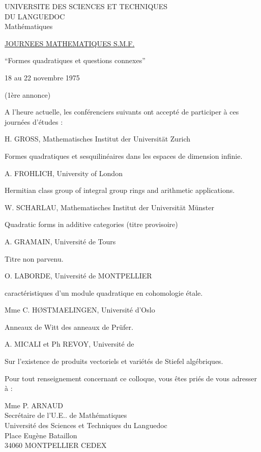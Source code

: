 UNIVERSITE DES SCIENCES ET TECHNIQUES\\
DU LANGUEDOC\\
Mathématiques

\uline{JOURNEES MATHEMATIQUES S.M.F.}

``Formes quadratiques et questions connexes''

18 au 22 novembre 1975

(1ère annonce)

A l'heure actuelle, les conférenciers suivants ont accepté de participer à ces journées d'études :

H. GROSS, Mathematisches Institut der Universität Zurich

Formes quadratiques et sesquilinéaires dans les espaces de dimension infinie.

A. FROHLICH, University of London

Hermitian class group of integral group rings and arithmetic applications.

W. SCHARLAU, Mathematisches Institut der Universität Münster

Quadratic forms in additive categories (titre provisoire)

A. GRAMAIN, Université de Tours

Titre non parvenu.

O. LABORDE, Université de MONTPELLIER

 caractéristiques d'un module quadratique en cohomologie étale.

Mme C. HØSTMAELINGEN, Université d'Oslo

Anneaux de Witt des anneaux de Prüfer.

A. MICALI et Ph REVOY, Université de 

Sur l'existence de produits vectoriels et variétés de Stiefel algébriques.

Pour tout renseignement concernant ce colloque, vous êtes priés de vous adresser à :

Mme P. ARNAUD\\
Secrétaire de l'U.E.. de Mathématiques\\
Université des Sciences et Techniques du Languedoc\\
Place Eugène Bataillon\\
34060 MONTPELLIER CEDEX

